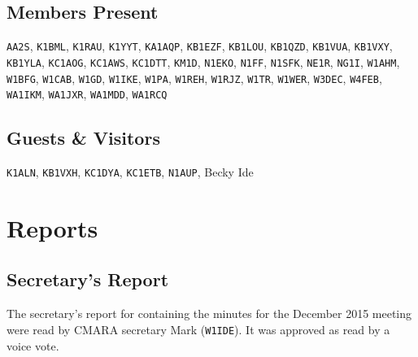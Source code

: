 \documentclass[10pt,letterpaper]{article}
\begin{document}
\subsection{Members Present}

\texttt{AA2S},
\texttt{K1BML},
\texttt{K1RAU},
\texttt{K1YYT},
\texttt{KA1AQP},
\texttt{KB1EZF},
\texttt{KB1LOU},
\texttt{KB1QZD},
\texttt{KB1VUA},
\texttt{KB1VXY},
\texttt{KB1YLA},
\texttt{KC1AOG},
\texttt{KC1AWS},
\texttt{KC1DTT},
\texttt{KM1D},
\texttt{N1EKO},
\texttt{N1FF},
\texttt{N1SFK},
\texttt{NE1R},
\texttt{NG1I},
\texttt{W1AHM},
\texttt{W1BFG},
\texttt{W1CAB},
\texttt{W1GD},
\texttt{W1IKE},
\texttt{W1PA},
\texttt{W1REH},
\texttt{W1RJZ},
\texttt{W1TR},
\texttt{W1WER},
\texttt{W3DEC},
\texttt{W4FEB},
\texttt{WA1IKM},
\texttt{WA1JXR},
\texttt{WA1MDD},
\texttt{WA1RCQ}

\subsection{Guests \& Visitors}
\texttt{K1ALN},
\texttt{KB1VXH},
\texttt{KC1DYA},
\texttt{KC1ETB},
\texttt{N1AUP},
Becky Ide

\section{Reports}

\subsection{Secretary's Report}

The secretary's report for containing the minutes for the December 2015 meeting were read by CMARA secretary Mark (\texttt{W1IDE}). It was approved as read by a voice vote.

\newpage
\end{document}
